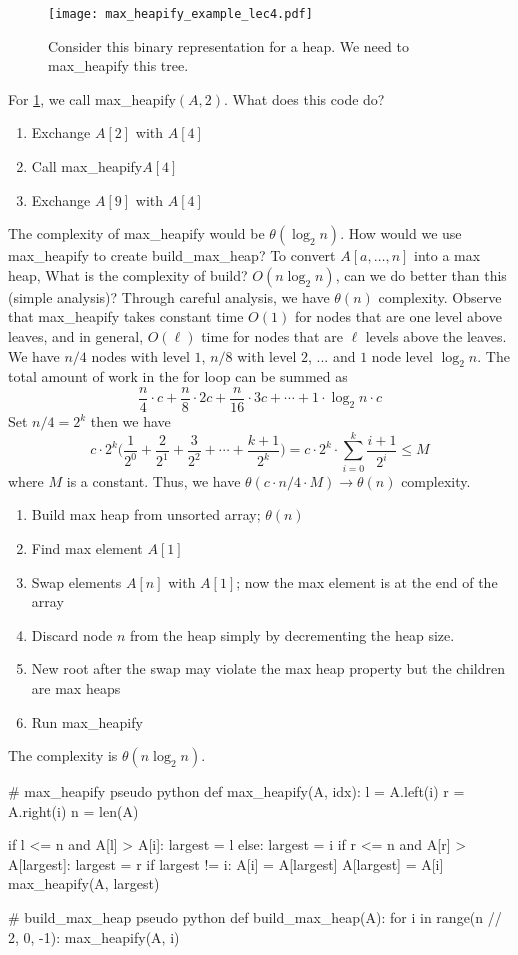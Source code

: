 \begin{figure}[h]
	\centering
	\texttt{[image: max\_heapify\_example\_lec4.pdf]}
	\caption{Consider this binary representation for a heap. We need to max\_heapify this tree.}
	\label{fig4:max_heapify}
\end{figure}
For \cref{fig4:max_heapify}, we call max\_heapify\((A, 2)\). What does this code do?
\begin{enumerate}[label=$\ast$]
	\item Exchange \(A[2]\) with \(A[4]\)
	\item Call max\_heapify\(A[4]\)
	\item Exchange \(A[9]\) with \(A[4]\)
\end{enumerate}
The complexity of max\_heapify would be \(\theta(\log_2 n)\). How would we use max\_heapify to 
create build\_max\_heap? To convert \(A[a,\ldots, n]\) into a max heap, What is the complexity of build?
\(O(n\log_2 n)\), can we do better than this (simple analysis)?
Through careful analysis, we have \(\theta(n)\) complexity. Observe that max\_heapify takes constant
time \(O(1)\) for nodes that are one level above leaves, and in general, \(O(\ell)\) time for nodes that
are \(\ell\) levels above the leaves. We have \(n / 4\) nodes with level \(1\), \(n / 8\) with level \(2\), ... and
\(1\) node level \(\log_2 n\). The total amount of work in the for loop can be summed as
\[
	\frac{n}{4}\cdot c + \frac{n}{8}\cdot 2c + \frac{n}{16}\cdot 3c + \cdots + 1\cdot\log_2 n\cdot c
\]
Set \(n / 4 = 2^k\) then we have 
\[
	c\cdot 2^k \Big(\frac{1}{2^0} + \frac{2}{2^1} + \frac{3}{2^2} + \cdots + \frac{k + 1}{2^k}\Big)
	= c\cdot 2^k\cdot\sum_{i = 0}^k\frac{i + 1}{2^i}\leq M
\]
where \(M\) is a constant. Thus, we have \(\theta(c\cdot n /4 \cdot M) \rightarrow \theta(n)\) complexity.
\begin{enumerate}
	\item Build max heap from unsorted array; \(\theta(n)\)
	\item Find max element \(A[1]\)
	\item Swap elements \(A[n]\) with \(A[1]\); now the max element is at the end of the array
	\item Discard node \(n\) from the heap simply by decrementing the heap size.
	\item New root after the swap may violate the max heap property but the children are max heaps
	\item Run max\_heapify
\end{enumerate}
The complexity is \(\theta(n\log_2 n)\).
\begin{python}
# max_heapify pseudo python
def max_heapify(A, idx):
    l = A.left(i)
    r = A.right(i)
    n = len(A)
    
    if l <= n and A[l] > A[i]:
        largest = l
    else:
        largest = i
    if r <= n and A[r] > A[largest]:
        largest = r
    if largest != i:
        A[i] = A[largest]
        A[largest] = A[i]
        max_heapify(A, largest)
        
        
# build_max_heap pseudo python
def build_max_heap(A):
    for i in range(n // 2, 0, -1):
        max_heapify(A, i)
\end{python}

